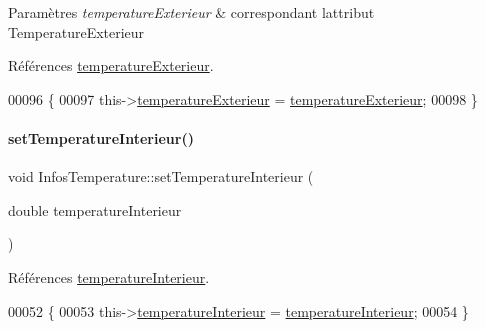 \begin{DoxyParams}{Paramètres}
{\em temperature\+Exterieur} & correspondant l\textquotesingle{}attribut Temperature\+Exterieur \\
\hline
\end{DoxyParams}


Références \hyperlink{class_infos_temperature_af80286a5b0e05d0379f53c0ebbc7d483}{temperature\+Exterieur}.


\begin{DoxyCode}
00096 \{
00097     this->\hyperlink{class_infos_temperature_af80286a5b0e05d0379f53c0ebbc7d483}{temperatureExterieur} = \hyperlink{class_infos_temperature_af80286a5b0e05d0379f53c0ebbc7d483}{temperatureExterieur};
00098 \}
\end{DoxyCode}
\mbox{\label{class_infos_temperature_ac11ec6b1860f43dc989a02a7967497e7}} 
\paragraph{\texorpdfstring{set\+Temperature\+Interieur()}{setTemperatureInterieur()}}
{\footnotesize\ttfamily void Infos\+Temperature\+::set\+Temperature\+Interieur (\begin{DoxyParamCaption}\item[{double}]{temperature\+Interieur }\end{DoxyParamCaption})}



Références \hyperlink{class_infos_temperature_a976ab7ead7ac82b5b8572807d778689e}{temperature\+Interieur}.


\begin{DoxyCode}
00052 \{
00053     this->\hyperlink{class_infos_temperature_a976ab7ead7ac82b5b8572807d778689e}{temperatureInterieur} = \hyperlink{class_infos_temperature_a976ab7ead7ac82b5b8572807d778689e}{temperatureInterieur};
00054 \}
\end{DoxyCode}
\mbox{\label{class_infos_temperature_a6fbc9ab43714a5ba6649648c15989dee}} 
